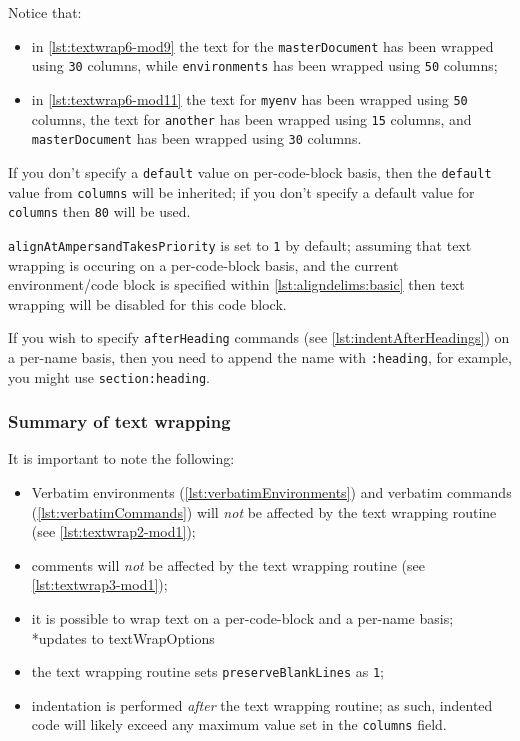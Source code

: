 	Notice that:
	\begin{itemize}
		\item in \cref{lst:textwrap6-mod9} the text for the \texttt{masterDocument} has been
		      wrapped using \texttt{30} columns, while \texttt{environments} has
		      been wrapped using \texttt{50} columns;
		\item in \cref{lst:textwrap6-mod11} the text for \texttt{myenv} has been wrapped
		      using \texttt{50} columns, the text for \texttt{another} has
		      been wrapped using \texttt{15} columns, and \texttt{masterDocument}
		      has been wrapped using \texttt{30} columns.
	\end{itemize}
	If you don't specify a \texttt{default} value on per-code-block basis, then
	the \texttt{default} value from \texttt{columns} will be inherited;
	if you don't specify a default value for \texttt{columns} then
	\texttt{80} will be used.

	\texttt{alignAtAmpersandTakesPriority} is set to \texttt{1} by default; assuming
	that text wrapping is occuring on a per-code-block basis, and the current
	environment/code block is specified within \vref{lst:aligndelims:basic} then text wrapping
	will be disabled for this code block.

	If you wish to specify \texttt{afterHeading} commands (see
	\vref{lst:indentAfterHeadings}) on a per-name basis, then you need to  append the name with
	\texttt{:heading}, for example, you might use \texttt{section:heading}.

\subsubsection{Summary of text wrapping}
	It is important to note the following:
	\begin{itemize}
		\item Verbatim environments (\vref{lst:verbatimEnvironments}) and verbatim commands
		      (\vref{lst:verbatimCommands}) will \emph{not} be affected by the text
		      wrapping routine (see \vref{lst:textwrap2-mod1});
		\item comments will \emph{not} be affected by the text wrapping routine (see
		      \vref{lst:textwrap3-mod1});
		\item it is possible to wrap text on a per-code-block and a per-name basis;
		      *{updates to textWrapOptions}
		\item the text wrapping routine sets \texttt{preserveBlankLines} as
		      \texttt{1};
		\item indentation is performed \emph{after} the text wrapping routine; as such,
		      indented code will likely exceed any maximum value set in the \texttt{columns}
		      field.
	\end{itemize}

